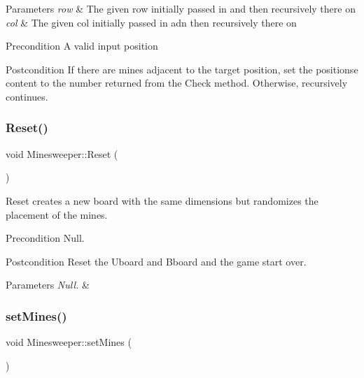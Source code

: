 \begin{DoxyParams}{Parameters}
{\em row} & The given row initially passed in and then recursively there on \\
\hline
{\em col} & The given col initially passed in adn then recursively there on \\
\hline
\end{DoxyParams}
\begin{DoxyPrecond}{Precondition}
A valid input position 
\end{DoxyPrecond}
\begin{DoxyPostcond}{Postcondition}
If there are mines adjacent to the target position, set the position\textquotesingle{}se content to the number returned from the Check method. Otherwise, recursively continues. 
\end{DoxyPostcond}
\mbox{\label{classMinesweeper_a7bb8b53ca69cd4959e5123a07047702f}} 
\subsubsection{\texorpdfstring{Reset()}{Reset()}}
{\footnotesize\ttfamily void Minesweeper\+::\+Reset (\begin{DoxyParamCaption}{ }\end{DoxyParamCaption})}



Reset creates a new board with the same dimensions but randomizes the placement of the mines. 

\begin{DoxyPrecond}{Precondition}
Null. 
\end{DoxyPrecond}
\begin{DoxyPostcond}{Postcondition}
Reset the Uboard and Bboard and the game start over. 
\end{DoxyPostcond}

\begin{DoxyParams}{Parameters}
{\em Null.} & \\
\hline
\end{DoxyParams}
\mbox{\label{classMinesweeper_a3150b5ddb8317214df23b2836ef12f50}} 
\subsubsection{\texorpdfstring{set\+Mines()}{setMines()}}
{\footnotesize\ttfamily void Minesweeper\+::set\+Mines (\begin{DoxyParamCaption}{ }\end{DoxyParamCaption})\hspace{0.3cm}{\ttfamily [private]}}



